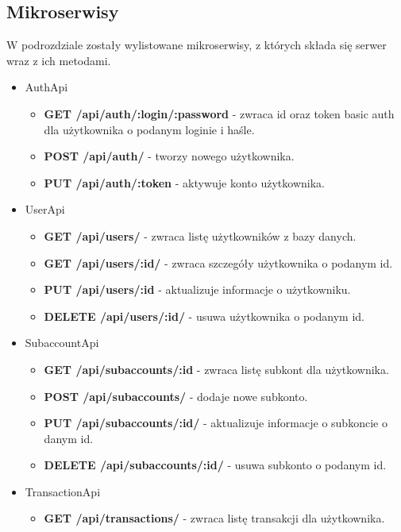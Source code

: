 \documentclass{article}
\begin{document}
	\subsection{Mikroserwisy}
	W podrozdziale zostały wylistowane mikroserwisy, z których składa się serwer wraz z ich 
	metodami.
	\begin{itemize}
		\item AuthApi
			\begin{itemize}
				\item \textbf{GET /api/auth/:login/:password} - zwraca id oraz token basic auth dla użytkownika o podanym loginie i haśle.

				\item \textbf{POST /api/auth/} - tworzy nowego użytkownika.

				\item \textbf{PUT /api/auth/:token} - aktywuje konto użytkownika.
			\end{itemize}
		\item UserApi
			\begin{itemize}
				\item \textbf{GET /api/users/} - zwraca listę użytkowników z bazy danych.
				
				\item \textbf{GET /api/users/:id/} - zwraca szczegóły użytkownika o podanym id.
				
				\item \textbf{PUT /api/users/:id} - aktualizuje informacje o użytkowniku.
				
				\item \textbf{DELETE /api/users/:id/} - usuwa użytkownika o podanym id.
				
			\end{itemize}
		\item SubaccountApi
			\begin{itemize}
				\item \textbf{GET /api/subaccounts/:id} - zwraca listę subkont dla użytkownika.
				
				\item \textbf{POST /api/subaccounts/} - dodaje nowe subkonto.
				
				\item \textbf{PUT /api/subaccounts/:id/} - aktualizuje informacje o subkoncie o danym id.
				
				\item \textbf{DELETE /api/subaccounts/:id/} - usuwa subkonto o podanym id.
			\end{itemize}
		\item TransactionApi
			\begin{itemize}
				\item \textbf{GET /api/transactions/} - zwraca listę transakcji dla użytkownika.
				

\end{itemize}
\end{itemize}
\end{document}
